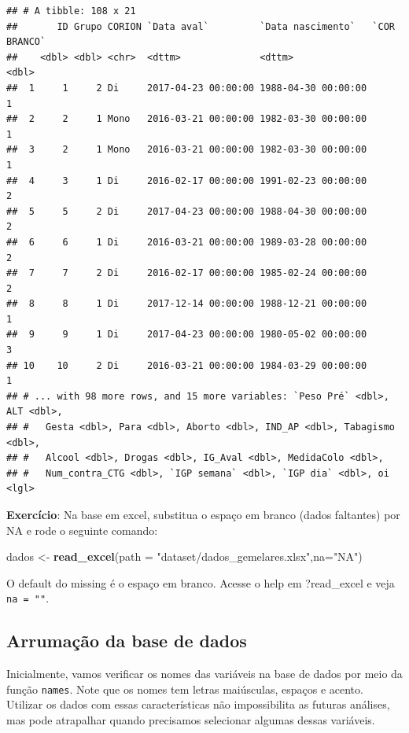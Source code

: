 \documentclass[
]{book}
\newenvironment{Shaded}{\begin{snugshade}}{\end{snugshade}}
\newcommand{\DataTypeTok}[1]{\textcolor[rgb]{0.13,0.29,0.53}{#1}}
\newcommand{\KeywordTok}[1]{\textcolor[rgb]{0.13,0.29,0.53}{\textbf{#1}}}
\newcommand{\NormalTok}[1]{#1}
\newcommand{\StringTok}[1]{\textcolor[rgb]{0.31,0.60,0.02}{#1}}
\begin{document}
\begin{verbatim}
## # A tibble: 108 x 21
##       ID Grupo CORION `Data aval`         `Data nascimento`   `COR BRANCO`
##    <dbl> <dbl> <chr>  <dttm>              <dttm>                     <dbl>
##  1     1     2 Di     2017-04-23 00:00:00 1988-04-30 00:00:00            1
##  2     2     1 Mono   2016-03-21 00:00:00 1982-03-30 00:00:00            1
##  3     2     1 Mono   2016-03-21 00:00:00 1982-03-30 00:00:00            1
##  4     3     1 Di     2016-02-17 00:00:00 1991-02-23 00:00:00            2
##  5     5     2 Di     2017-04-23 00:00:00 1988-04-30 00:00:00            2
##  6     6     1 Di     2016-03-21 00:00:00 1989-03-28 00:00:00            2
##  7     7     2 Di     2016-02-17 00:00:00 1985-02-24 00:00:00            2
##  8     8     1 Di     2017-12-14 00:00:00 1988-12-21 00:00:00            1
##  9     9     1 Di     2017-04-23 00:00:00 1980-05-02 00:00:00            3
## 10    10     2 Di     2016-03-21 00:00:00 1984-03-29 00:00:00            1
## # ... with 98 more rows, and 15 more variables: `Peso Pré` <dbl>, ALT <dbl>,
## #   Gesta <dbl>, Para <dbl>, Aborto <dbl>, IND_AP <dbl>, Tabagismo <dbl>,
## #   Alcool <dbl>, Drogas <dbl>, IG_Aval <dbl>, MedidaColo <dbl>,
## #   Num_contra_CTG <dbl>, `IGP semana` <dbl>, `IGP dia` <dbl>, oi <lgl>
\end{verbatim}

\textbf{Exercício}: Na base em excel, substitua o espaço em branco (dados faltantes) por NA e rode o seguinte comando:

\begin{Shaded}
\begin{Highlighting}[]
\NormalTok{dados <-}\StringTok{ }\KeywordTok{read_excel}\NormalTok{(}\DataTypeTok{path =} \StringTok{"dataset/dados_gemelares.xlsx"}\NormalTok{,}\DataTypeTok{na=}\StringTok{"NA"}\NormalTok{)}
\end{Highlighting}
\end{Shaded}

O default do missing é o espaço em branco. Acesse o help em ?read\_excel e veja \texttt{na\ =\ ""}.

\hypertarget{arrumauxe7uxe3o-da-base-de-dados}{%
\subsection{Arrumação da base de dados}\label{arrumauxe7uxe3o-da-base-de-dados}}

Inicialmente, vamos verificar os nomes das variáveis na base de dados por meio da função \texttt{names}. Note que os nomes tem letras maiúsculas, espaços e acento. Utilizar os dados com essas características não impossibilita as futuras análises, mas pode atrapalhar quando precisamos selecionar algumas dessas variáveis.
\end{document}
